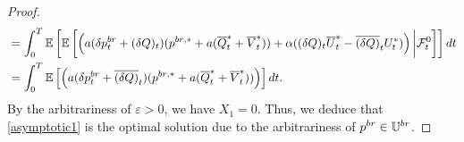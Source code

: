 \documentclass[10pt,a4paper]{amsart}
\begin{document}
\begin{proof}
\begin{align*}
&=\int_0^T\mathbb{E}\left[\mathbb{E}\left[\left(a(\delta p_t^{{\rm br}}+(\delta Q)_t)(p^{{\rm br},*}+a( \overline{Q}_t^*+ \overline{V}_t^*))+\alpha ((\delta Q)_t\overline{U}_t^*- \overline{(\delta Q)}_tU_t^*)\right)\bigg|\mathcal{F}_t^0\right]\right]dt\\
&=\int_0^T\mathbb{E}\left[\left(a(\delta p_t^{{\rm br}}+\overline{(\delta Q)}_t)(p^{{\rm br},*}+a( \overline{Q}_t^*+ \overline{V}_t^*))\right)\right]dt.
\end{align*}
By the arbitrariness of $\varepsilon>0$, we have $X_1=0$. Thus, we deduce that \eqref{asymptotic1} is the optimal solution due to the arbitrariness of $p^{{\rm br}}\in\mathbb{U}^{\rm br}$.
\end{proof}
\end{document}
